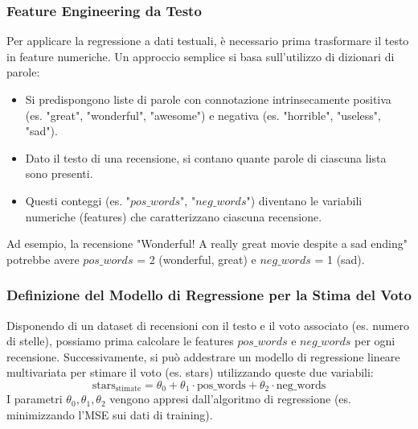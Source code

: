 \documentclass{article}
\begin{document}
\subsubsection{Feature Engineering da Testo}
Per applicare la regressione a dati testuali, è necessario prima trasformare il testo in feature numeriche. Un approccio semplice si basa sull'utilizzo di dizionari di parole:
\begin{itemize}
    \item Si predispongono liste di parole con connotazione intrinsecamente positiva (es. "great", "wonderful", "awesome") e negativa (es. "horrible", "useless", "sad").
    \item Dato il testo di una recensione, si contano quante parole di ciascuna lista sono presenti.
    \item Questi conteggi (es. "$pos\_words$", "$neg\_words$") diventano le variabili numeriche (features) che caratterizzano ciascuna recensione.
\end{itemize}
Ad esempio, la recensione "Wonderful! A really great movie despite a sad ending" potrebbe avere $pos\_words$ = 2 (wonderful, great) e $neg\_words$ = 1 (sad).

\subsubsection{Definizione del Modello di Regressione per la Stima del Voto}
Disponendo di un dataset di recensioni con il testo e il voto associato (es. numero di stelle), possiamo prima calcolare le features $pos\_words$ e $neg\_words$ per ogni recensione.
Successivamente, si può addestrare un modello di regressione lineare multivariata per stimare il voto (es. stars) utilizzando queste due variabili:
$$ \text{stars}_{\text{stimate}} = \theta_0 + \theta_1 \cdot \text{pos\_words} + \theta_2 \cdot \text{neg\_words} $$
I parametri $\theta_0, \theta_1, \theta_2$ vengono appresi dall'algoritmo di regressione (es. minimizzando l'MSE sui dati di training).
\end{document}

